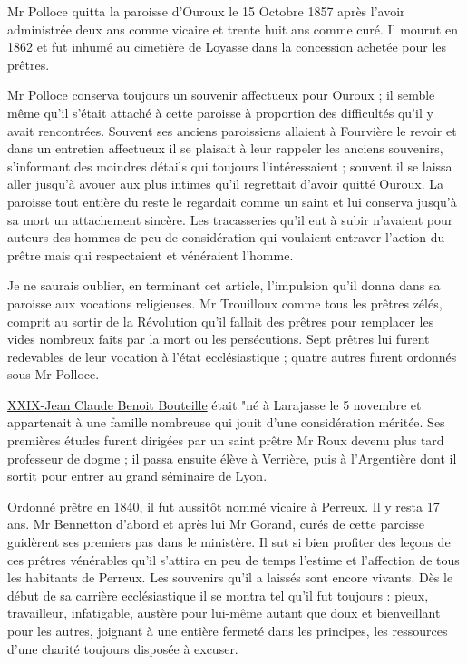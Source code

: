 Mr Polloce quitta la paroisse d'Ouroux le 15 Octobre 1857 après l'avoir administrée deux ans comme vicaire et trente huit ans comme curé. Il mourut en 1862 et fut inhumé au cimetière de Loyasse dans la concession achetée pour les prêtres.

Mr Polloce conserva toujours un souvenir affectueux pour Ouroux ; il semble même qu'il s'était attaché à cette paroisse à proportion des difficultés qu'il y avait rencontrées. Souvent ses anciens paroissiens allaient à Fourvière le revoir et dans un entretien affectueux il se plaisait à leur rappeler les anciens souvenirs, s'informant des moindres détails qui toujours l'intéressaient ; souvent il se laissa aller jusqu'à avouer aux plus intimes qu'il regrettait d'avoir quitté Ouroux. La paroisse tout entière du reste le regardait comme un saint et lui conserva jusqu'à sa mort un attachement sincère. Les tracasseries qu'il eut à subir n'avaient pour auteurs des hommes de peu de considération qui voulaient entraver l'action du prêtre mais qui respectaient et vénéraient l'homme.

Je ne saurais oublier, en terminant cet article, l'impulsion qu'il donna dans sa paroisse aux vocations religieuses. Mr Trouilloux comme tous les prêtres zélés, comprit au sortir de la Révolution qu'il fallait des prêtres pour remplacer les vides nombreux faits par la mort ou les persécutions. Sept prêtres lui furent redevables de leur vocation à l'état ecclésiastique ; quatre autres furent ordonnés sous Mr Polloce.

\underline{XXIX-Jean Claude Benoit Bouteille} était "né à Larajasse le 5 novembre et appartenait à une famille nombreuse qui jouit d'une considération méritée. Ses premières études furent dirigées par un saint prêtre Mr Roux devenu plus tard professeur de dogme ; il passa ensuite élève à Verrière, puis à l'Argentière dont il sortit pour entrer
au grand séminaire de Lyon.

Ordonné prêtre en 1840, il fut aussitôt nommé vicaire à Perreux. Il y resta 17 ans. Mr Bennetton d'abord et après lui Mr Gorand, curés de cette paroisse guidèrent ses premiers pas dans le ministère. Il sut si bien profiter des leçons de ces prêtres vénérables qu'il s'attira en peu de temps l'estime et l'affection de tous les habitants de Perreux. Les souvenirs qu'il a laissés sont encore vivants. Dès le début de sa carrière ecclésiastique il se montra tel qu'il fut toujours : pieux, travailleur, infatigable, austère pour lui-même autant que doux et bienveillant pour les autres, joignant à une entière fermeté dans les principes, les ressources d'une charité toujours disposée à excuser.


